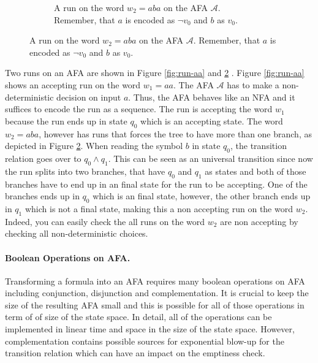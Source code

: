 \begin{example}
\begin{figure}
\begin{subfigure}{0.2\textwidth}
		\caption{A run on the word $w_2 = aba$ on the AFA $\mathcal{A}$. Remember, that $a$ is encoded as $\lnot v_0$  and $b$ as $v_0$.} \label{fig:run-aba}
\end{subfigure}
\end{figure}
Two runs on an AFA are shown in Figure \ref{fig:run-aa} and \ref{fig:run-aba} . Figure \ref{fig:run-aa} shows an accepting run on the word $w_1 = aa$. 
The AFA $\mathcal{A}$ has to make a non-deterministic decision on input $a$.
Thus, the AFA behaves like an NFA and it suffices to encode the run as a sequence.
The run is accepting the word $w_1$ because the run ends up in state $q_0$ which is an accepting state.
The word $w_2 = aba$, however has runs that forces the tree to have more than one branch, as depicted in Figure \ref{fig:run-aba}.
When reading the symbol $b$ in state $q_0$, the transition relation goes over to $q_0 \wedge q_1$.
This can be seen as an universal transition since now the run splits into two branches, that have $q_0$ and $q_1$ as states and both of those branches have to end up in an final state for the run to be accepting.
One of the branches ends up in $q_0$ which is an final state, however, the other branch ends up in $q_1$ which is not a final state, making this a non accepting run on the word $w_2$.
Indeed, you can easily check the all runs on the word $w_2$ are non accepting by checking all non-deterministic choices.
\end{example}

\paragraph*{Boolean Operations on AFA.} Transforming a formula into an AFA requires many boolean operations on AFA including conjunction, disjunction and complementation.
It is crucial to keep the size of the resulting AFA small and this is possible for all of those operations in term of of size of the state space.
In detail, all of the operations can be implemented in linear time and space in the size of the state space.
However, complementation contains possible sources for exponential blow-up for the transition relation which can have an impact on the emptiness check.

